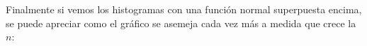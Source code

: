 \documentclass[a4paper]{article}
\begin{document}
	Finalmente si vemos los histogramas con una funci\'on normal superpuesta encima, se puede apreciar como el gr\'afico se asemeja cada vez m\'as a medida que crece la $n$:
	
	\begin{figure}[H]
		\centering
		\hfill
	\end{figure}
	
\end{document}
